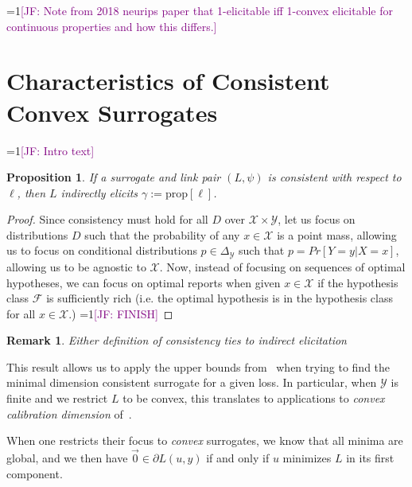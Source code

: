 \documentclass{article}
\newcommand{\Comments}{1}
\newcommand{\mynote}[2]{\ifnum\Comments=1\textcolor{#1}{#2}\fi}
\newcommand{\jessie}[1]{\mynote{purple}{[JF: #1]}}
\newcommand{\simplex}{\Delta_\Y}
\newcommand{\prop}[1]{\mathrm{prop}[#1]}
\newcommand{\F}{\mathcal{F}}
\newcommand{\X}{\mathcal{X}}
\newcommand{\Y}{\mathcal{Y}}
\newtheorem{proposition}{Proposition}
\newtheorem{remark}{Remark}
\begin{document}
\jessie{Note from 2018 neurips paper that 1-elicitable iff 1-convex elicitable for continuous properties and how this differs.}


\section{Characteristics of Consistent Convex Surrogates}\label{sec:char-convex}
\jessie{Intro text}
\begin{proposition}\label{prop:consistent-implies-indir-elic}
	If a surrogate and link pair $(L, \psi)$ is consistent with respect to $\ell$, then $L$ indirectly elicits $\gamma := \prop{\ell}$.
\end{proposition}
\begin{proof}
Since consistency must hold for all $D$ over $\X \times \Y$, let us focus on distributions $D$ such that the probability of any $x \in \X$ is a point mass, allowing us to focus on conditional distributions $p \in \simplex$ such that $p = Pr[Y = y | X = x]$, allowing us to be agnostic to $\X$.
Now, instead of focusing on sequences of optimal hypotheses, we can focus on optimal reports when given $x \in \X$ if the hypothesis class $\F$ is sufficiently rich (i.e. the optimal hypothesis is in the hypothesis class for all $x \in \X$.)
 \jessie{FINISH}
\end{proof}

\begin{remark}
	Either definition of consistency ties to indirect elicitation
\end{remark}

This result allows us to apply the upper bounds from~\cite{frongillo2015elicitation} when trying to find the minimal dimension consistent surrogate for a given loss.
In particular, when $\Y$ is finite and we restrict $L$ to be convex, this translates to applications to \emph{convex calibration dimension} of~\cite{ramaswamy2016convex}.


When one restricts their focus to \emph{convex} surrogates, we know that all minima are global, and we then have $\vec 0  \in \partial L(u, y)$ if and only if $u$ minimizes $L$ in its first component.
\end{document}
